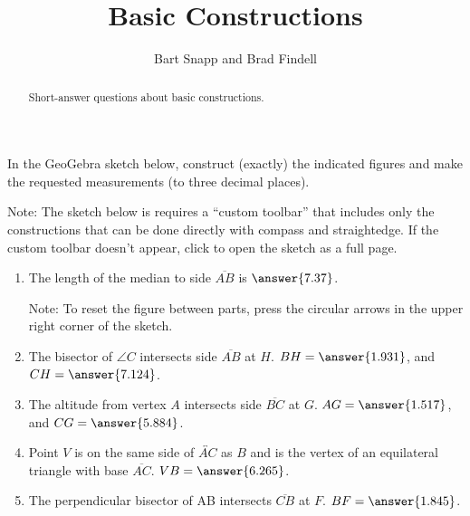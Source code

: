 \documentclass[nooutcomes]{ximera}
\title{Basic Constructions}
\author{Bart Snapp and Brad Findell}
\begin{document}
\begin{abstract}
Short-answer questions about basic constructions. 
\end{abstract}
\maketitle

\begin{problem}
In the GeoGebra sketch below, construct (exactly) the indicated figures 
and make the requested measurements (to three decimal places).  

Note: The sketch below is requires a ``custom toolbar'' that includes only the constructions that can be done directly with compass and straightedge.  If the custom toolbar doesn't appear, click 
 to open the sketch as a full page.  

\begin{center}  
\end{center}
\begin{enumerate}
\item The length of the median to side $\overline{AB}$ 
is $\answer{7.37}$.  

Note: To reset the figure between parts, press the circular arrows in the upper right corner of the sketch.   

\item The bisector of $\angle C$ intersects side $\overline{AB}$ at $H$.  
$BH =  \answer{1.931}$, and $CH = \answer{7.124}$.  

\item The altitude from vertex $A$ intersects side $\overline{BC}$ at $G$.
$AG = \answer{1.517}$, and 
$CG = \answer{5.884}$.  

\item Point $V$ is on the same side of $\overleftrightarrow{AC}$ as $B$ and is the vertex of an equilateral triangle with base $\overline{AC}$.  
$VB = \answer{6.265}$. 

\item The perpendicular bisector of AB intersects $\overline{CB}$ at $F$.  
$BF = \answer{1.845}$.
\end{enumerate}

\end{problem}
\end{document}
